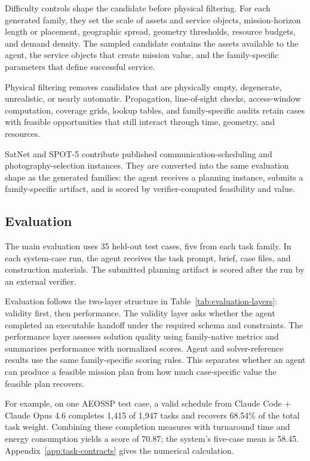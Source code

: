 \documentclass[]{mosi}
\begin{document}
Difficulty controls shape the candidate before physical filtering. For each generated family, they set the scale of assets and service objects, mission-horizon length or placement, geographic spread, geometry thresholds, resource budgets, and demand density. The sampled candidate contains the assets available to the agent, the service objects that create mission value, and the family-specific parameters that define successful service.

Physical filtering removes candidates that are physically empty, degenerate, unrealistic, or nearly automatic. Propagation, line-of-sight checks, access-window computation, coverage grids, lookup tables, and family-specific audits retain cases with feasible opportunities that still interact through time, geometry, and resources.

SatNet and SPOT-5 contribute published communication-scheduling and photography-selection instances. They are converted into the same evaluation shape as the generated families: the agent receives a planning instance, submits a family-specific artifact, and is scored by verifier-computed feasibility and value.

\subsection{Evaluation}
\label{sec:evaluation}

The main evaluation uses 35 held-out test cases, five from each task family. In each system-case run, the agent receives the task prompt, brief, case files, and construction materials. The submitted planning artifact is scored after the run by an external verifier.

Evaluation follows the two-layer structure in Table~\ref{tab:evaluation-layers}: validity first, then performance. The validity layer asks whether the agent completed an executable handoff under the required schema and constraints. The performance layer assesses solution quality using family-native metrics and summarizes performance with normalized scores. Agent and solver-reference results use the same family-specific scoring rules. This separates whether an agent can produce a feasible mission plan from how much case-specific value the feasible plan recovers.

For example, on one AEOSSP test case, a valid schedule from Claude Code + Claude Opus 4.6 completes 1,415 of 1,947 tasks and recovers 68.54\% of the total task weight. Combining these completion measures with turnaround time and energy consumption yields a score of 70.87; the system's five-case mean is 58.45. Appendix~\ref{app:task-contracts} gives the numerical calculation.
\end{document}
